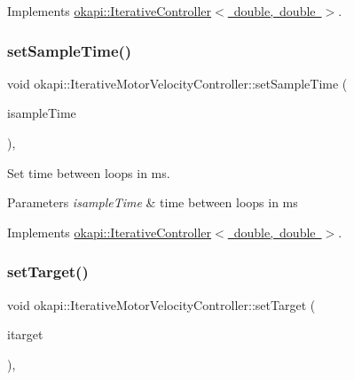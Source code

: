 Implements \mbox{\hyperlink{classokapi_1_1IterativeController_ae1a7d9bd29d176a26bcc70c741f0d50f}{okapi\+::\+Iterative\+Controller$<$ double, double $>$}}.

\mbox{\label{classokapi_1_1IterativeMotorVelocityController_ab94173452bbba03ffe51a4e700e2a870}} 
\subsubsection{\texorpdfstring{setSampleTime()}{setSampleTime()}}
{\footnotesize\ttfamily void okapi\+::\+Iterative\+Motor\+Velocity\+Controller\+::set\+Sample\+Time (\begin{DoxyParamCaption}\item[{Q\+Time}]{isample\+Time }\end{DoxyParamCaption})\hspace{0.3cm}{\ttfamily [override]}, {\ttfamily [virtual]}}

Set time between loops in ms.


\begin{DoxyParams}{Parameters}
{\em isample\+Time} & time between loops in ms \\
\hline
\end{DoxyParams}


Implements \mbox{\hyperlink{classokapi_1_1IterativeController_ac4cfb1b37a3c707b2fc8f2fbda526f3e}{okapi\+::\+Iterative\+Controller$<$ double, double $>$}}.

\mbox{\label{classokapi_1_1IterativeMotorVelocityController_a9a5a1d57df3faa75474245200ed34a18}} 
\subsubsection{\texorpdfstring{setTarget()}{setTarget()}}
{\footnotesize\ttfamily void okapi\+::\+Iterative\+Motor\+Velocity\+Controller\+::set\+Target (\begin{DoxyParamCaption}\item[{double}]{itarget }\end{DoxyParamCaption})\hspace{0.3cm}{\ttfamily [override]}, {\ttfamily [virtual]}}

